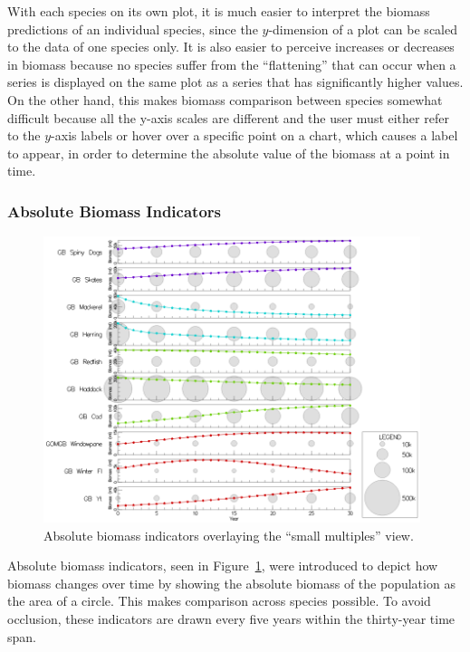 With each species on its own plot, it is much easier to interpret the biomass predictions of an individual species, since the $y$-dimension of a plot can be scaled to the data of one species only.  It is also easier to perceive increases or decreases in biomass because no species suffer from the ``flattening'' that can occur when a series is displayed on the same plot as a series that has significantly higher values.  On the other hand, this makes biomass comparison between species somewhat difficult because all the y-axis scales are different and the user must either refer to the $y$-axis labels or hover over a specific point on a chart, which causes a label to appear, in order to determine the absolute value of the biomass at a point in time.

\subsubsection{Absolute Biomass Indicators}

\begin{figure}[t]
	\centering
	\includegraphics[width=11cm]{figures/png/msprod_abssize.png}
	\caption[Absolute biomass indicators overlaying the ``small multiples'' view]{Absolute biomass indicators overlaying the ``small multiples'' view.}
	\label{fig:msprod_abssize}
\end{figure}

Absolute biomass indicators, seen in Figure~\ref{fig:msprod_abssize}, were introduced to depict how biomass changes over time by showing the absolute biomass of the population as the area of a circle.  This makes comparison across species possible.  To avoid occlusion, these indicators are drawn every five years within the thirty-year time span.


